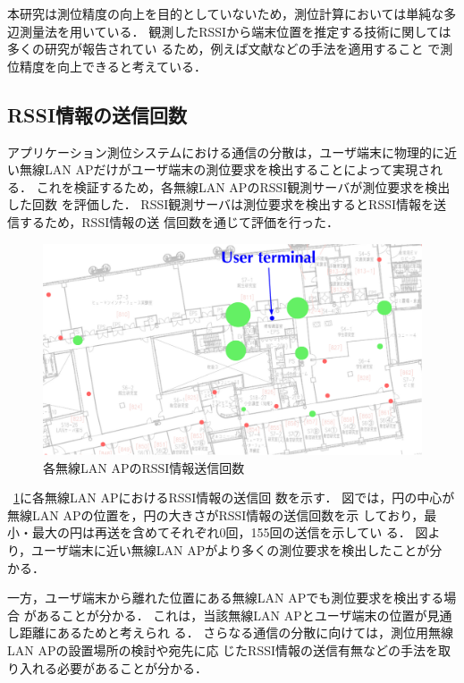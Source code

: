 \documentclass[technicalreport]{ieicej}
\begin{document}
本研究は測位精度の向上を目的としていないため，測位計算においては単純な多
辺測量法を用いている．
観測したRSSIから端末位置を推定する技術に関しては多くの研究が報告されてい
るため，例えば文献\cite{izumi13:awpn_acc_imprv}などの手法を適用すること
で測位精度を向上できると考えている．

\subsection{RSSI情報の送信回数}

アプリケーション測位システムにおける通信の分散は，ユーザ端末に物理的に近
い無線LAN APだけがユーザ端末の測位要求を検出することによって実現される．
これを検証するため，各無線LAN APのRSSI観測サーバが測位要求を検出した回数
を評価した．
RSSI観測サーバは測位要求を検出するとRSSI情報を送信するため，RSSI情報の送
信回数を通じて評価を行った．

\begin{figure}[bt]
 \centering
 \includegraphics[width=0.8\columnwidth]{figure/catch_count.eps}
 \caption{各無線LAN APのRSSI情報送信回数}
 \label{fig:catch_count}
\end{figure}

\figurename~\ref{fig:catch_count}に各無線LAN APにおけるRSSI情報の送信回
数を示す．
図では，円の中心が無線LAN APの位置を，円の大きさがRSSI情報の送信回数を示
しており，最小・最大の円は再送を含めてそれぞれ0回，155回の送信を示してい
る．
図より，ユーザ端末に近い無線LAN APがより多くの測位要求を検出したことが分
かる．

一方，ユーザ端末から離れた位置にある無線LAN APでも測位要求を検出する場合
があることが分かる．
これは，当該無線LAN APとユーザ端末の位置が見通し距離にあるためと考えられ
る．
さらなる通信の分散に向けては，測位用無線LAN APの設置場所の検討や宛先に応
じたRSSI情報の送信有無などの手法を取り入れる必要があることが分かる．

\end{document}
